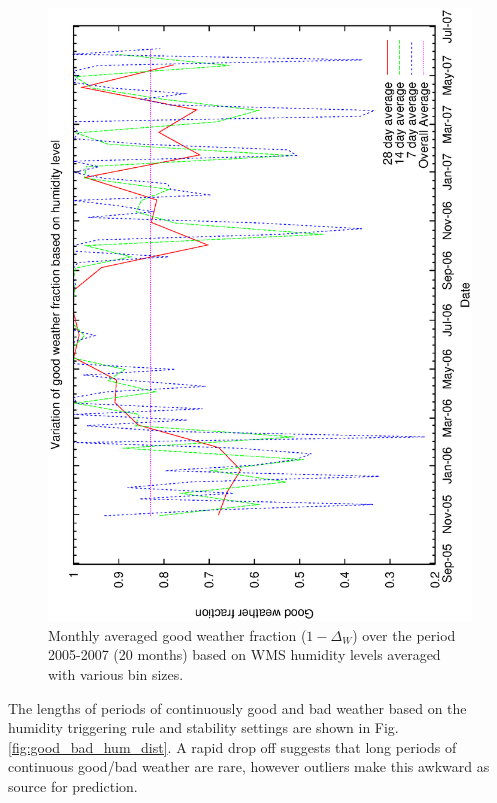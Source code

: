 \begin{figure}[htbp]
\begin{center}
    \includegraphics[scale=0.4, angle=-90]{figures/ecs/hum_frac_time.eps}
\end{center} 
\caption[Monthly averaged good weather fraction ($1-\Delta_W$) based on humidity level.]
{Monthly averaged good weather fraction ($1-\Delta_W$) over the period 2005-2007 (20 months) based on WMS humidity levels averaged with various bin sizes.} 
\label{fig:wms_hum_frac_time}
\end{figure}


The lengths of periods of continuously good and bad weather based on the humidity triggering rule and stability settings are shown in Fig. \ref{fig:good_bad_hum_dist}. A rapid drop off suggests that long periods of continuous good/bad weather are rare, however outliers make this awkward as source for prediction.

